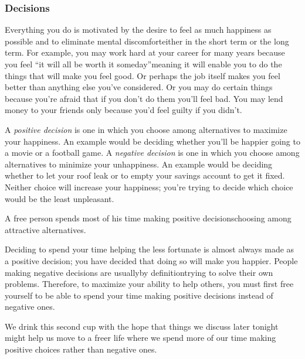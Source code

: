 {  \subsubsection*{Decisions}
  \newReading Everything you do is motivated by the desire to feel as much
  happiness as possible and to eliminate mental discomfort\textemdash{}either in
  the short term or the long term.
  For example, you may work hard at your career for many years because you feel
  ``it will all be worth it someday''\textemdash{}meaning it will enable you to
  do the things that will make you feel good. Or perhaps the job itself makes
  you feel better than anything else you've considered.
  Or you may do certain things because you're afraid that if you don't do them
  you'll feel bad. You may lend money to your friends only because you'd feel
  guilty if you didn't.

  A \textit{positive decision} is one in which you choose among alternatives to
  maximize your happiness. An example would be deciding whether you'll be
  happier going to a movie or a football game.
  A \textit{negative decision} is one in which you choose among alternatives to
  minimize your unhappiness. An example would be deciding whether to let your
  roof leak or to empty your savings account to get it fixed. Neither choice
  will increase your happiness; you're trying to decide which choice would be
  the least unpleasant.

  \newReading A free person spends most of his time making positive
  decisions\textemdash{}choosing among attractive alternatives.

  Deciding to spend your time helping the less fortunate is almost always made
  as a positive decision; you have decided that doing so will make you happier.
  People making negative decisions are usually\textemdash{}by
  definition\textemdash{}trying to solve their own problems. Therefore, to
  maximize your ability to help others, you must first free yourself to be able
  to spend your time making positive decisions instead of negative ones.

  We drink this second cup with the hope that things we discuss later tonight
  might help us move to a freer life where we spend more of our time making
  positive choices rather than negative ones.
}

